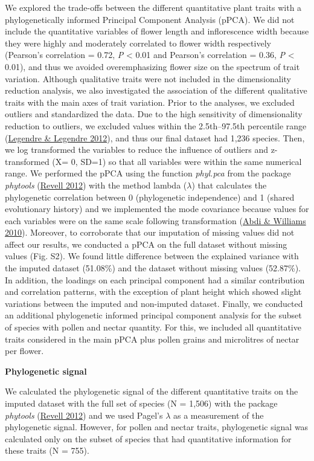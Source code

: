 \documentclass[
  12pt,
  a4paper,
]{article}
\begin{document}
We explored the trade-offs between the different quantitative plant traits with a phylogenetically informed Principal Component Analysis (pPCA). We did not include the quantitative variables of flower length and inflorescence width because they were highly and moderately correlated to flower width respectively (Pearson's correlation = 0.72, \emph{P} \textless{} 0.01 and Pearson's correlation = 0.36, \emph{P} \textless{} 0.01), and thus we avoided overemphasizing flower size on the spectrum of trait variation. Although qualitative traits were not included in the dimensionality reduction analysis, we also investigated the association of the different qualitative traits with the main axes of trait variation. Prior to the analyses, we excluded outliers and standardized the data. Due to the high sensitivity of dimensionality reduction to outliers, we excluded values within the 2.5th--97.5th percentile range (\protect\hyperlink{ref-legendre2012}{Legendre \& Legendre 2012}), and thus our final dataset had 1,236 species. Then, we log transformed the variables to reduce the influence of outliers and z-transformed (X= 0, SD=1) so that all variables were within the same numerical range. We performed the pPCA using the function \emph{phyl.pca} from the package \emph{phytools} (\protect\hyperlink{ref-revell2012}{Revell 2012}) with the method lambda (\(\lambda\)) that calculates the phylogenetic correlation between 0 (phylogenetic independence) and 1 (shared evolutionary history) and we implemented the mode covariance because values for each variables were on the same scale following transformation (\protect\hyperlink{ref-abdi2010}{Abdi \& Williams 2010}). Moreover, to corroborate that our imputation of missing values did not affect our results, we conducted a pPCA on the full dataset without missing values (Fig. S2). We found little difference between the explained variance with the imputed dataset (51.08\%) and the dataset without missing values (52.87\%). In addition, the loadings on each principal component had a similar contribution and correlation patterns, with the exception of plant height which showed slight variations between the imputed and non-imputed dataset. Finally, we conducted an additional phylogenetic informed principal component analysis for the subset of species with pollen and nectar quantity. For this, we included all quantitative traits considered in the main pPCA plus pollen grains and microlitres of nectar per flower.

\textbf{Phylogenetic signal}

We calculated the phylogenetic signal of the different quantitative traits on the imputed dataset with the full set of species (N = 1,506) with the package \emph{phytools} (\protect\hyperlink{ref-revell2012}{Revell 2012}) and we used Pagel's \(\lambda\) as a measurement of the phylogenetic signal. However, for pollen and nectar traits, phylogenetic signal was calculated only on the subset of species that had quantitative information for these traits (N = 755).
\end{document}
